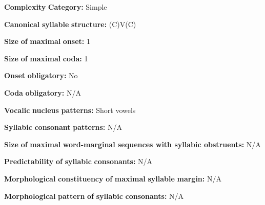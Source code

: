 \documentclass[output=paper]{langsci/langscibook}
\begin{document}
\begin{styleBody}
\textbf{Complexity} \textbf{Category:} Simple
\end{styleBody}

\begin{styleBody}
\textbf{Canonical} \textbf{syllable} \textbf{structure:} (C)V(C) \citep[30-32]{Guillaume2008}
\end{styleBody}

\begin{styleBody}
\textbf{Size} \textbf{of} \textbf{maximal} \textbf{onset:} 1
\end{styleBody}

\begin{styleBody}
\textbf{Size} \textbf{of} \textbf{maximal} \textbf{coda:} 1
\end{styleBody}

\begin{styleBody}
\textbf{Onset} \textbf{obligatory:} No
\end{styleBody}

\begin{styleBody}
\textbf{Coda} \textbf{obligatory:} N/A
\end{styleBody}

\begin{styleBody}
\textbf{Vocalic} \textbf{nucleus} \textbf{patterns:} Short vowels
\end{styleBody}

\begin{styleBody}
\textbf{Syllabic} \textbf{consonant} \textbf{patterns:} N/A
\end{styleBody}

\begin{styleBody}
\textbf{Size} \textbf{of} \textbf{maximal} \textbf{word{}-marginal sequences with syllabic obstruents:} N/A
\end{styleBody}

\begin{styleBody}
\textbf{Predictability} \textbf{of} \textbf{syllabic} \textbf{consonants:} N/A
\end{styleBody}

\begin{styleBody}
\textbf{Morphological} \textbf{constituency} \textbf{of} \textbf{maximal} \textbf{syllable} \textbf{margin:} N/A
\end{styleBody}

\begin{styleBody}
\textbf{Morphological} \textbf{pattern} \textbf{of} \textbf{syllabic} \textbf{consonants:} N/A
\end{styleBody}
\end{document}
